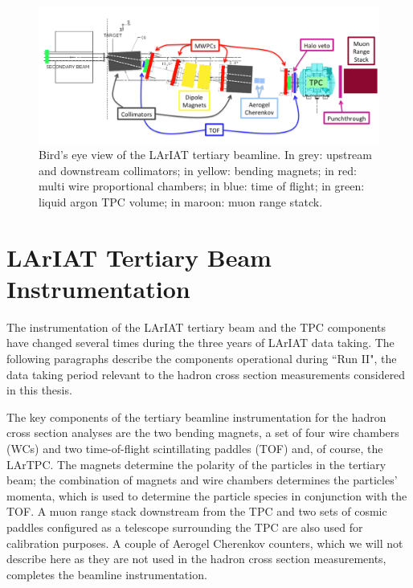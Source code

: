 \begin{figure}
  \centering  	
\includegraphics[width=\textwidth,height=\textheight,keepaspectratio]{Chapter-3/Images/Tertiary.png}
\caption{Bird's eye view of the LArIAT tertiary beamline. In grey: upstream and downstream collimators; in yellow: bending magnets; in red: multi wire proportional chambers; in blue: time of flight; in green: liquid argon TPC volume; in maroon: muon range statck.}
\label{fig:tert-layout}
\end{figure}


\section{LArIAT Tertiary Beam Instrumentation}\label{sec:Instrumentation}

The instrumentation of the LArIAT tertiary beam and the TPC components have changed several times during the three years of LArIAT data taking. The following paragraphs describe the components operational during ``Run II", the data taking period relevant to the hadron cross section measurements considered in this thesis. 

The key components of the tertiary beamline instrumentation for the hadron cross section analyses are the two bending magnets, a set of four wire chambers (WCs) and two time-of-flight scintillating paddles (TOF) and, of course, the LArTPC.  The magnets determine the polarity of the particles in the tertiary beam; the combination of magnets and wire chambers determines the particles' momenta, which is used to determine the particle species in conjunction with the TOF.
A muon range stack downstream from the TPC and two sets of cosmic paddles configured as a telescope surrounding the TPC are also used for calibration purposes.
A couple of Aerogel Cherenkov counters, which we will not describe here as they are not used in the hadron cross section measurements,  completes the beamline instrumentation.


